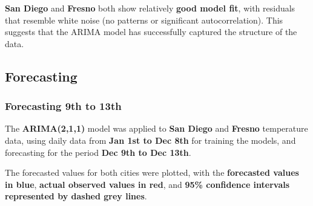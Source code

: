 \documentclass[
  11pt,
]{article}
\newenvironment{Shaded}{\begin{snugshade}}{\end{snugshade}}
\newcommand{\AttributeTok}[1]{\textcolor[rgb]{0.40,0.45,0.13}{#1}}
\newcommand{\CommentTok}[1]{\textcolor[rgb]{0.37,0.37,0.37}{#1}}
\newcommand{\DecValTok}[1]{\textcolor[rgb]{0.68,0.00,0.00}{#1}}
\newcommand{\FunctionTok}[1]{\textcolor[rgb]{0.28,0.35,0.67}{#1}}
\newcommand{\NormalTok}[1]{\textcolor[rgb]{0.00,0.23,0.31}{#1}}
\newcommand{\OtherTok}[1]{\textcolor[rgb]{0.00,0.23,0.31}{#1}}
\newcommand{\SpecialCharTok}[1]{\textcolor[rgb]{0.37,0.37,0.37}{#1}}
\begin{document}
\textbf{San Diego} and \textbf{Fresno} both show relatively \textbf{good
model fit}, with residuals that resemble white noise (no patterns or
significant autocorrelation). This suggests that the ARIMA model has
successfully captured the structure of the data.

\subsection{Forecasting}\label{forecasting}

\subsubsection{Forecasting 9th to 13th}\label{forecasting-9th-to-13th}

The \textbf{ARIMA(2,1,1)} model was applied to \textbf{San Diego} and
\textbf{Fresno} temperature data, using daily data from \textbf{Jan 1st
to Dec 8th} for training the models, and forecasting for the period
\textbf{Dec 9th to Dec 13th}.

The forecasted values for both cities were plotted, with the
\textbf{forecasted values in blue}, \textbf{actual observed values in
red}, and \textbf{95\% confidence intervals represented by dashed grey
lines}.

\begin{Shaded}
\end{Shaded}
\end{document}
